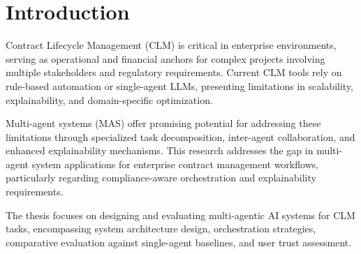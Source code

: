 
\chapter{Introduction}\label{chapter:introduction}

Contract Lifecycle Management (CLM) is critical in enterprise environments, serving as operational and financial anchors for complex projects involving multiple stakeholders and regulatory requirements. Current CLM tools rely on rule-based automation or single-agent LLMs, presenting limitations in scalability, explainability, and domain-specific optimization.

Multi-agent systems (MAS) offer promising potential for addressing these limitations through specialized task decomposition, inter-agent collaboration, and enhanced explainability mechanisms. This research addresses the gap in multi-agent system applications for enterprise contract management workflows, particularly regarding compliance-aware orchestration and explainability requirements.

The thesis focuses on designing and evaluating multi-agentic AI systems for CLM tasks, encompassing system architecture design, orchestration strategies, comparative evaluation against single-agent baselines, and user trust assessment.
